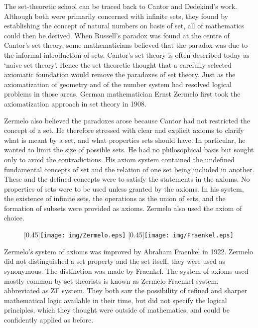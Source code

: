 \documentclass{article}
\begin{document}
The set-theoretic school can be traced back to Cantor and Dedekind's work. Although both were primarily concerned with infinite sets, they found by establishing the concept of natural numbers on basis of set, all of mathematics could then be derived. When Russell's paradox was found at the centre of Cantor's set theory, some mathematicians believed that the paradox was due to the informal introduction of sets. Cantor's set theory is often described today as `naive set theory'. Hence the set theoretic thought that a carefully selected axiomatic foundation would remove the paradoxes of set theory. Just as the axiomatization of geometry and of the number system had resolved logical problems in those areas. German mathematician Ernst Zermelo first took the axiomatization approach in set theory in 1908.

Zermelo also believed the paradoxes arose because Cantor had not restricted the concept of a set. He therefore stressed with clear and explicit axioms to clarify what is meant by a set, and what properties sets should have. In particular, he wanted to limit the size of possible sets. He had no philosophical basis but sought only to avoid the contradictions. His axiom system contained the undefined fundamental concepts of set and the relation of one set being included in another. These and the defined concepts were to satisfy the statements in the axioms. No properties of sets were to be used unless granted by the axioms. In his system, the existence of infinite sets, the operations as the union of sets, and the formation of subsets were provided as axioms. Zermelo also used the axiom of choice\cite{M-Kline-2007}.

\begin{figure}[htbp]
  \centering
  [0.45\linewidth]{\texttt{[image: img/Zermelo.eps]}} \quad
  [0.45\linewidth]{\texttt{[image: img/Fraenkel.eps]}}
  \captionsetup{labelformat=empty}
  \caption{}
  \label{fig:Zermelo-and-Fraenkel}
\end{figure}

 
Zermelo's system of axioms was improved by Abraham Fraenkel in 1922. Zermelo did not distinguished a set property and the set itself, they were used as synonymous. The distinction was made by Fraenkel. The system of axioms used mostly common by set theorists is known as Zermelo-Fraenkel system, abbreviated as ZF system. They both saw the possibility of refined and sharper mathematical logic available in their time, but did not specify the logical principles, which they thought were outside of mathematics, and could be confidently applied as before\cite{M-Kline-2007}.
\end{document}
